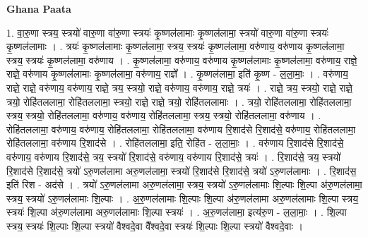 \documentclass[17pt]{extarticle}
\begin{document}
\textbf{Ghana Paata } \newline

1. वा॒रु॒णा स्त्रय॒ स्त्रयो॑ वारु॒णा वा॑रु॒णा स्त्रयः॑ कृ॒ष्णल॑लामाः कृ॒ष्णल॑लामा॒ स्त्रयो॑ वारु॒णा वा॑रु॒णा स्त्रयः॑ कृ॒ष्णल॑लामाः । . त्रयः॑ कृ॒ष्णल॑लामाः कृ॒ष्णल॑लामा॒ स्त्रय॒ स्त्रयः॑ कृ॒ष्णल॑लामा॒ वरु॑णाय॒ वरु॑णाय कृ॒ष्णल॑लामा॒ स्त्रय॒ स्त्रयः॑ कृ॒ष्णल॑लामा॒ वरु॑णाय । . कृ॒ष्णल॑लामा॒ वरु॑णाय॒ वरु॑णाय कृ॒ष्णल॑लामाः कृ॒ष्णल॑लामा॒ वरु॑णाय॒ राज्ञे॒ राज्ञे॒ वरु॑णाय कृ॒ष्णल॑लामाः कृ॒ष्णल॑लामा॒ वरु॑णाय॒ राज्ञे᳚ । . कृ॒ष्णल॑लामा॒ इति॑ कृ॒ष्ण - ल॒ला॒माः॒ । . वरु॑णाय॒ राज्ञे॒ राज्ञे॒ वरु॑णाय॒ वरु॑णाय॒ राज्ञे॒ त्रय॒ स्त्रयो॒ राज्ञे॒ वरु॑णाय॒ वरु॑णाय॒ राज्ञे॒ त्रयः॑ । . राज्ञे॒ त्रय॒ स्त्रयो॒ राज्ञे॒ राज्ञे॒ त्रयो॒ रोहि॑तललामा॒ रोहि॑तललामा॒ स्त्रयो॒ राज्ञे॒ राज्ञे॒ त्रयो॒ रोहि॑तललामाः । . त्रयो॒ रोहि॑तललामा॒ रोहि॑तललामा॒ स्त्रय॒ स्त्रयो॒ रोहि॑तललामा॒ वरु॑णाय॒ वरु॑णाय॒ रोहि॑तललामा॒ स्त्रय॒ स्त्रयो॒ रोहि॑तललामा॒ वरु॑णाय । . रोहि॑तललामा॒ वरु॑णाय॒ वरु॑णाय॒ रोहि॑तललामा॒ रोहि॑तललामा॒ वरु॑णाय रि॒शाद॑से रि॒शाद॑से॒ वरु॑णाय॒ रोहि॑तललामा॒ रोहि॑तललामा॒ वरु॑णाय रि॒शाद॑से । . रोहि॑तललामा॒ इति॒ रोहि॑त - ल॒ला॒माः॒ । . वरु॑णाय रि॒शाद॑से रि॒शाद॑से॒ वरु॑णाय॒ वरु॑णाय रि॒शाद॑से॒ त्रय॒ स्त्रयो॑ रि॒शाद॑से॒ वरु॑णाय॒ वरु॑णाय रि॒शाद॑से॒ त्रयः॑ । . रि॒शाद॑से॒ त्रय॒ स्त्रयो॑ रि॒शाद॑से रि॒शाद॑से॒ त्रयो॑ ऽरु॒णल॑लामा अरु॒णल॑लामा॒ स्त्रयो॑ रि॒शाद॑से रि॒शाद॑से॒ त्रयो॑ ऽरु॒णल॑लामाः । . रि॒शाद॑स॒ इति॑ रिश - अद॑से । . त्रयो॑ ऽरु॒णल॑लामा अरु॒णल॑लामा॒ स्त्रय॒ स्त्रयो॑ ऽरु॒णल॑लामाः शि॒ल्पाः शि॒ल्पा अ॑रु॒णल॑लामा॒ स्त्रय॒ स्त्रयो॑ ऽरु॒णल॑लामाः शि॒ल्पाः । . अ॒रु॒णल॑लामाः शि॒ल्पाः शि॒ल्पा अ॑रु॒णल॑लामा अरु॒णल॑लामाः शि॒ल्पा स्त्रय॒ स्त्रयः॑ शि॒ल्पा अ॑रु॒णल॑लामा अरु॒णल॑लामाः शि॒ल्पा स्त्रयः॑ । . अ॒रु॒णल॑लामा॒ इत्य॑रु॒ण - ल॒ला॒माः॒ । . शि॒ल्पा स्त्रय॒ स्त्रयः॑ शि॒ल्पाः शि॒ल्पा स्त्रयो॑ वैश्वदे॒वा वै᳚श्वदे॒वा स्त्रयः॑ शि॒ल्पाः शि॒ल्पा स्त्रयो॑ वैश्वदे॒वाः । \newline
\end{document}
